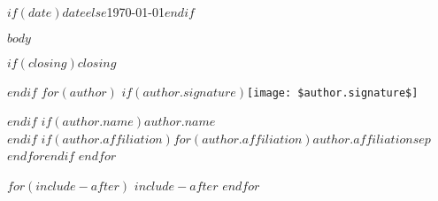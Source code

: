 \documentclass[$if(fontsize)$$fontsize$,$endif$$if(lang)$$lang$,$endif$$if(papersize)$$papersize$,$endif$$for(classoption)$$classoption$$sep$,$endfor$]{$documentclass$}
\begin{document}

\begin{flushright}$if(date)$$date$$else$\today$endif$\end{flushright}\bigskip%

$body$

\bigskip
\hfill\begin{minipage}{\dimexpr0.5\textwidth}
$if(closing)$$closing$\par$endif$
$for(author)$
$if(author.signature)$\texttt{[image: \$author.signature\$]}\par$endif$
$if(author.name)$$author.name$\\$endif$
$if(author.affiliation)$$for(author.affiliation)$$author.affiliation$$sep$\\$endfor$$endif$
$endfor$
\end{minipage}

$for(include-after)$
$include-after$
$endfor$
\end{document}
